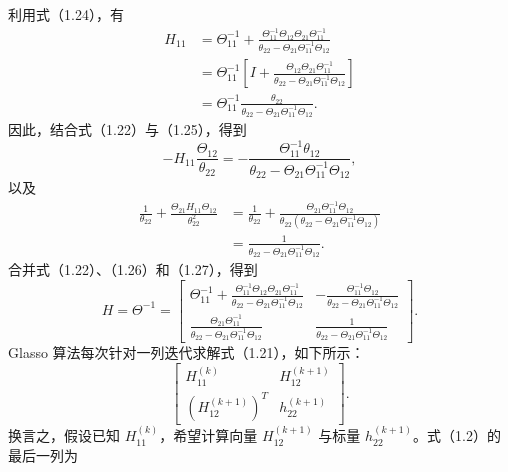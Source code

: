 利用式（1.24），有
\begin{equation}
\begin{aligned}
H_{11}
&=\Theta_{11}^{-1}+\frac{\Theta_{11}^{-1}\Theta_{12}\Theta_{21}\Theta_{11}^{-1}}
{\theta_{22}-\Theta_{21}\Theta_{11}^{-1}\Theta_{12}}\\
&=\Theta_{11}^{-1}\left[I+\frac{\Theta_{12}\Theta_{21}\Theta_{11}^{-1}}
{\theta_{22}-\Theta_{21}\Theta_{11}^{-1}\Theta_{12}}\right]\\
&=\Theta_{11}^{-1}\frac{\theta_{22}}
{\theta_{22}-\Theta_{21}\Theta_{11}^{-1}\Theta_{12}}.
\end{aligned}\tag{1.25}
\end{equation}
因此，结合式（1.22）与（1.25），得到
\begin{equation}
-H_{11}\frac{\Theta_{12}}{\theta_{22}}
=-\frac{\Theta_{11}^{-1}\theta_{12}}
{\theta_{22}-\Theta_{21}\Theta_{11}^{-1}\Theta_{12}},
\tag{1.26}
\end{equation}
以及
\begin{equation}
\begin{aligned}
\frac1{\theta_{22}}+\frac{\Theta_{21}H_{11}\Theta_{12}}{\theta_{22}^2}
&=\frac1{\theta_{22}}+\frac{\Theta_{21}\Theta_{11}^{-1}\Theta_{12}}
{\theta_{22}(\theta_{22}-\Theta_{21}\Theta_{11}^{-1}\Theta_{12})}\\
&=\frac1{\theta_{22}-\Theta_{21}\Theta_{11}^{-1}\Theta_{12}}.
\end{aligned}\tag{1.27}
\end{equation}
合并式（1.22）、（1.26）和（1.27），得到
\begin{equation}
H=\Theta^{-1}=\begin{bmatrix}
\displaystyle\Theta_{11}^{-1}+\frac{\Theta_{11}^{-1}\Theta_{12}\Theta_{21}\Theta_{11}^{-1}}
{\theta_{22}-\Theta_{21}\Theta_{11}^{-1}\Theta_{12}}
&\displaystyle-\frac{\Theta_{11}^{-1}\Theta_{12}}
{\theta_{22}-\Theta_{21}\Theta_{11}^{-1}\Theta_{12}}\\[1.4em]
\displaystyle\frac{\Theta_{21}\Theta_{11}^{-1}}
{\theta_{22}-\Theta_{21}\Theta_{11}^{-1}\Theta_{12}}
&\displaystyle\frac1{\theta_{22}-\Theta_{21}\Theta_{11}^{-1}\Theta_{12}}
\end{bmatrix}.
\tag{1.28}
\end{equation}
Glasso 算法每次针对一列迭代求解式（1.21），如下所示：
\[
\begin{bmatrix}H_{11}^{(k)}&H_{12}^{(k+1)}\\(H_{12}^{(k+1)})^T&h_{22}^{(k+1)}\end{bmatrix}.
\]
换言之，假设已知 $H_{11}^{(k)}$，希望计算向量 $H_{12}^{(k+1)}$ 与标量 $h_{22}^{(k+1)}$。式（1.2）的最后一列为
